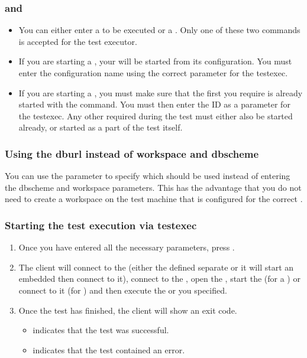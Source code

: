 \subsubsection{\gdsuites{} and \gdjobs{}}
\label{TasksTestExecSuiteOrJob}
\begin{itemize}
\item You can either enter a \gdsuite{} to be executed or a \gdjob{}. Only one of these two commands is accepted for the test executor. 
\item If you are starting a \gdsuite{}, your \gdaut{} will be started from its configuration. You must enter the configuration name using the correct parameter for the testexec.
\item  If you are starting a \gdjob{}, you must make sure that the first \gdaut{} you require is already started with the  command. You must then enter the \gdaut{} ID as a parameter for the testexec. Any other \gdauts{} required during the test must either also be started already, or started as a part of the test itself.
\end{itemize}

\subsubsection{Using the dburl instead of workspace and dbscheme}
\label{TasksTestExecDburl}
You can use the  parameter to specify which \gddb{} should be used instead of entering the dbscheme and workspace parameters. This has the advantage that you do not need to create a workspace on the test machine that is configured for the correct \gddb{}.

\subsubsection{Starting the test execution via testexec}
\begin{enumerate}
\item Once you have entered all the necessary parameters, press . 
\item The client will connect to the \gdagent (either the defined separate \gdagent{} or it will start an embedded \gdagent{} then connect to it), connect to the \gddb{}, open the \gdproject{}, start the \gdaut{} (for a \gdsuite{}) or connect to it (for \gdjobs{})  and then execute the \gdsuite{} or \gdjob{} you specified.
\item Once the test has finished, the client will show an exit code.
\begin{itemize}
  \item {} indicates that the test was successful.
  \item {} indicates that the test contained an error.
\end{itemize}
\end{enumerate}

